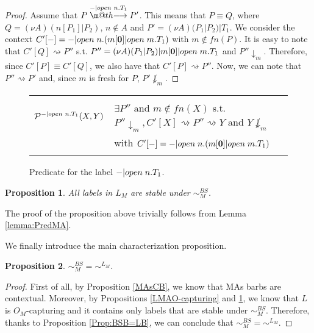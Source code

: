 \documentclass[copyright,creativecommons]{eptcs}
\makeatletter
\newcommand{\nil}{\mathbf{0}}
\def\tr#1{\stackrel{#1}{\to}}
\let\oldrightarrow\to
\renewcommand{\to}[1][]{\ifthenelse{\equal{#1}{}}{\oldrightarrow}{\ensuremath{\xrightarrow{{}_{#1}}}}}
\def \rightarrowfill{\m@th\mathord{\smash-}\mkern-6mu\cleaders\hbox{$\mkern-2mu\mathord{\smash-}\mkern-2mu$}\hfill
  \mkern-6mu\mathord\rightarrow}
\newcommand{\barb}[1]{\downarrow_{#1}}
\newcommand{\bsbis}{\sim^{BS}}
\def\tr#1{\stackrel{#1}{\rightarrowfill}}
\newcommand{\react}{\rightsquigarrow}
\newcommand{\<}{\langle}
\renewcommand{\>}{\rangle}
\def\tr#1{\stackrel{#1}{\rightarrowfill}}
\def \rightarrowfill{\m@th\mathord{\smash-}\mkern-6mu\cleaders\hbox{$\mkern-2mu\mathord{\smash-}\mkern-2mu$}\hfill
  \mkern-6mu\mathord\rightarrow}
\newtheorem{proposition}{Proposition}{}
\makeatother
\begin{document}
\begin{proof}
Assume that $P \tr{-|open \hspace{1mm} n.T_1} P'$. This means that
$P \equiv Q$, where $Q = (\nu A) (n[P_1]|P_2)$, $n \not \in A $ and
$P'= (\nu A) (P_1|P_2)|T_1$. We consider the context $C'[-] = -|open
\hspace{1mm} n.(m[\nil]|open \hspace{1mm} m.T_1)$ with $m\not \in
fn(P)$. It is easy to note that $C'[Q] \react P''$ s.t. $P'' = (\nu
A) (P_1|P_2)|m[\nil]|open \hspace{1 mm} m.T_1$ and $P'' \barb m$.
Therefore, since $C'[P] \equiv C'[Q]$, we also have that $C'[P]
\react P''$. Now, we can note that $P'' \react P'$ and, since $m$ is
fresh for $P$, $P' \not \barb m$.
\end{proof}

\begin{figure}[!t]
\begin{tabular}{p{3 cm} p{12.1 cm}}
\hline
\\
$\mathcal P^{-|open \hspace{1mm} n.T_1}(X,Y)$ & $\exists P''$ and $m \not \in fn(X)$ s.t. $P'' \barb m,
C'[X] \react P'' \react Y$ and $Y \not \barb m$ \\
& with $C'[-] = -|open \hspace{1mm} n.(m[\nil]|open \hspace{1mm} m.T_1)$\\ \\
\hline
\end{tabular}
\caption{Predicate for the label $-|open \hspace{1mm} n.T_1$.}
\label{PredMA}
\end{figure}

\begin{proposition} \label{LMAStable}
All labels in $L_M$ are stable under $\bsbis_{\scriptscriptstyle{M}}$.
\end{proposition}

The proof of the proposition above trivially follows from Lemma \ref{lemma:PredMA}.



We finally introduce the main characterization proposition.

\begin{proposition}
$\bsbis_{\scriptscriptstyle{M}} = \sim^{L_M}$.
\end{proposition}

\begin{proof}
  First of all, by Proposition \ref{MAsCB}, we know that MAs barbs are
  contextual.  Moreover, by Propositions \ref{LMAO-capturing} and
  \ref{LMAStable}, we know that $L$ is
  $O_{\scriptscriptstyle{M}}$-capturing and it contains only labels
  that are stable under $\bsbis_{\scriptscriptstyle{M}}$.  Therefore,
  thanks to Proposition \ref{Prop:BSB=LB}, we can conclude that
  $\bsbis_{\scriptscriptstyle{M}}= \sim^{L_M}$.
\end{proof}
\end{document}

